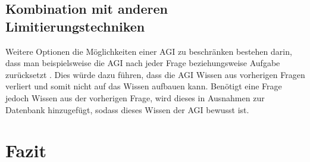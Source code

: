        \subsection{Kombination mit anderen Limitierungstechniken}
        Weitere Optionen die Möglichkeiten einer AGI zu beschränken bestehen darin, dass man beispielsweise die
        AGI nach jeder Frage beziehungsweise Aufgabe zurücksetzt \cite[s. 309]{armstrongforthcoming}. Dies würde dazu
        führen, dass die AGI Wissen aus vorherigen Fragen verliert und somit nicht auf das Wissen aufbauen kann.
        Benötigt eine Frage jedoch Wissen aus der vorherigen Frage, wird dieses in Ausnahmen zur Datenbank hinzugefügt,
        sodass dieses Wissen der AGI bewusst ist.

    \section{Fazit}


    \newpage
    
    





